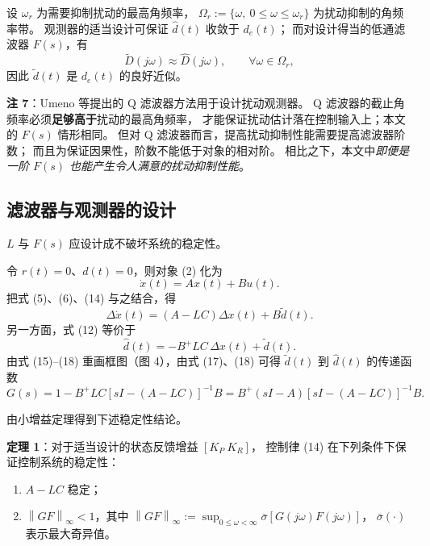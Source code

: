 \documentclass[11pt,a4paper]{ctexart}
\newcommand{\norm}[1]{\left\lVert #1 \right\rVert}
\begin{document}
设 $\omega_r$ 为需要抑制扰动的最高角频率，
$\Omega_r:=\{\omega,\ 0\le\omega\le\omega_r\}$ 为扰动抑制的角频率带。
观测器的适当设计可保证 $\hat d(t)$ 收敛于 $d_e(t)$；
而对设计得当的低通滤波器 $F(s)$，有
\begin{equation}
\tilde D(j\omega)\approx\hat D(j\omega),\qquad \forall\omega\in\Omega_r,
\end{equation}
因此 $\tilde d(t)$ 是 $d_e(t)$ 的良好近似。

\textbf{注 7}：Umeno 等提出的 Q 滤波器方法用于设计扰动观测器。
Q 滤波器的截止角频率必须\textbf{足够高于}扰动的最高角频率，
才能保证扰动估计落在控制输入上；本文的 $F(s)$ 情形相同。
但对 Q 滤波器而言，提高扰动抑制性能需要提高滤波器阶数；
而且为保证因果性，阶数不能低于对象的相对阶。
相比之下，本文中\emph{即便是一阶 $F(s)$ 也能产生令人满意的扰动抑制性能}。

\subsection{滤波器与观测器的设计}

$L$ 与 $F(s)$ 应设计成不破坏系统的稳定性。

令 $r(t)=0$、$d(t)=0$，则对象 (2) 化为
\begin{equation}
\dot x(t)=A x(t)+B u(t).
\end{equation}
把式 (5)、(6)、(14) 与之结合，得
\begin{equation}
\Delta\dot x(t)=(A-LC)\Delta x(t)+B\tilde d(t).
\end{equation}
另一方面，式 (12) 等价于
\begin{equation}
\hat d(t)=-B^{+}LC\,\Delta x(t)+\tilde d(t).
\end{equation}
由式 (15)--(18) 重画框图（图 4），由式 (17)、(18) 可得
$\tilde d(t)$ 到 $\hat d(t)$ 的传递函数
\begin{equation}
G(s)=1-B^{+}LC\left[sI-(A-LC)\right]^{-1}B
=B^{+}(sI-A)\left[sI-(A-LC)\right]^{-1}B.
\end{equation}

由小增益定理得到下述稳定性结论。

\textbf{定理 1}：对于适当设计的状态反馈增益 $[K_P\ K_R]$，
控制律 (14) 在下列条件下保证控制系统的稳定性：
\begin{enumerate}[label=\arabic*)]
\item $A-LC$ 稳定；
\item $\norm{GF}_\infty<1$，其中
$\norm{GF}_\infty:=\sup_{0\le\omega<\infty}\bar\sigma\left[G(j\omega)F(j\omega)\right]$，
$\bar\sigma(\cdot)$ 表示最大奇异值。
\end{enumerate}
\end{document}
